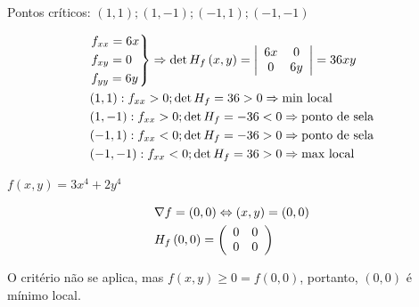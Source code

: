 \documentclass[11pt, oneside, a4paper]{gsm-l}
\begin{document}
\begin{sol}
    Pontos críticos: $\left( {1,1} \right);\left( {1, - 1} \right);\left( { - 1,1} \right);\left( { - 1, - 1} \right)$

\[
\begin{gathered}
\left. \begin{gathered}
f_{xx}  = 6x \hfill \\
f_{xy}  = 0 \hfill \\
f_{yy}  = 6y \hfill \\
\end{gathered}  \right\} \Rightarrow \det H_f \left( {x,y} \right) = \left| {\begin{array}{*{20}c}
{6x} & 0  \\
0 & {6y}  \\

\end{array} } \right| = 36xy \hfill \\
  \left( {1,1} \right):f_{xx}  > 0;\det H_f  = 36 > 0 \Rightarrow {\text{min local}} \hfill \\
  \left( {1, - 1} \right):f_{xx}  > 0;\det H_f  =  - 36 < 0 \Rightarrow {\text{ponto de sela}} \hfill \\
  \left( { - 1,1} \right):f_{xx}  < 0;\det H_f  =  - 36 > 0 \Rightarrow {\text{ponto de sela}} \hfill \\
  \left( { - 1, - 1} \right):f_{xx}  < 0;\det H_f  = 36 > 0 \Rightarrow {\text{max local}} \hfill \\
\end{gathered}
\]

\end{sol}

\newpage 

\begin{exem}
$f\left( {x,y} \right) = 3x^4  + 2y^4$
\end{exem}

\begin{sol}
\[
\begin{gathered}
  \nabla f = \left( {0,0} \right) \Leftrightarrow \left( {x,y} \right) = \left( {0,0} \right) \hfill \\
H_f \left( {0,0} \right) = \left( {\begin{array}{*{20}c}
0 & 0  \\
0 & 0  \\

\end{array} } \right) \hfill \\
\end{gathered}
\]

    O critério não se aplica, mas $f\left( {x,y} \right) \geqslant 0 = f\left( {0,0} \right)$, portanto, $\left( {0,0} \right)$ é mínimo local.
\end{sol}
\end{document}
